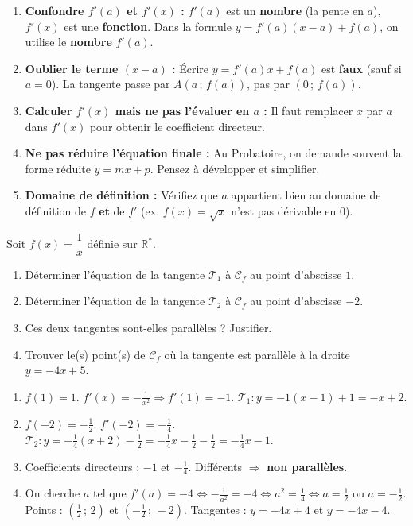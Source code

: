 \documentclass[11pt]{article}
\begin{document}
\begin{attention}
\begin{enumerate}
  \item \textbf{Confondre $f'(a)$ et $f'(x)$ :} $f'(a)$ est un \textbf{nombre} (la pente en $a$), $f'(x)$ est une \textbf{fonction}. Dans la formule $y = f'(a)(x-a)+f(a)$, on utilise le \textbf{nombre} $f'(a)$.
  \item \textbf{Oublier le terme $(x-a)$ :} Écrire $y = f'(a)x + f(a)$ est \textbf{faux} (sauf si $a=0$). La tangente passe par $A(a\,;\,f(a))$, pas par $(0\,;\,f(a))$.
  \item \textbf{Calculer $f'(x)$ mais ne pas l'évaluer en $a$ :} Il faut remplacer $x$ par $a$ dans $f'(x)$ pour obtenir le coefficient directeur.
  \item \textbf{Ne pas réduire l'équation finale :} Au Probatoire, on demande souvent la forme réduite $y = mx + p$. Pensez à développer et simplifier.
  \item \textbf{Domaine de définition :} Vérifiez que $a$ appartient bien au domaine de définition de $f$ \textbf{et} de $f'$ (ex. $f(x)=\sqrt{x}$ n'est pas dérivable en $0$).
\end{enumerate}
\end{attention}

\begin{exercice}
Soit $f(x) = \dfrac{1}{x}$ définie sur $\mathbb{R}^*$.
\begin{enumerate}
  \item Déterminer l'équation de la tangente $\mathcal{T}_1$ à $\mathcal{C}_f$ au point d'abscisse $1$.
  \item Déterminer l'équation de la tangente $\mathcal{T}_2$ à $\mathcal{C}_f$ au point d'abscisse $-2$.
  \item Ces deux tangentes sont-elles parallèles ? Justifier.
  \item Trouver le(s) point(s) de $\mathcal{C}_f$ où la tangente est parallèle à la droite $y = -4x + 5$.
\end{enumerate}
\end{exercice}

\begin{corrige}[Exercice : Tangentes à $f(x)=1/x$]
\begin{enumerate}
  \item $f(1)=1$. $f'(x)=-\frac{1}{x^2} \Rightarrow f'(1)=-1$.
        $\mathcal{T}_1 : y = -1(x-1)+1 = -x+2$.
  \item $f(-2)=-\frac{1}{2}$. $f'(-2)=-\frac{1}{4}$.
        $\mathcal{T}_2 : y = -\frac{1}{4}(x+2)-\frac{1}{2} = -\frac{1}{4}x - \frac{1}{2} - \frac{1}{2} = -\frac{1}{4}x - 1$.
  \item Coefficients directeurs : $-1$ et $-\frac{1}{4}$. Différents $\Rightarrow$ \textbf{non parallèles}.
  \item On cherche $a$ tel que $f'(a) = -4 \iff -\frac{1}{a^2} = -4 \iff a^2 = \frac{1}{4} \iff a = \frac{1}{2}$ ou $a = -\frac{1}{2}$.
        Points : $(\frac{1}{2}\,;\,2)$ et $(-\frac{1}{2}\,;\,-2)$.
        Tangentes : $y = -4x + 4$ et $y = -4x - 4$.
\end{enumerate}
\end{corrige}
\end{document}
